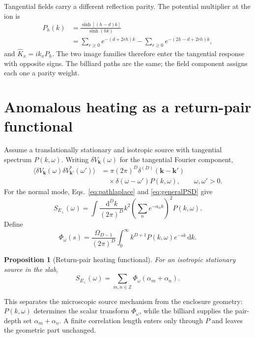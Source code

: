 \documentclass[aps,pra,twocolumn,superscriptaddress,longbibliography,nofootinbib,floatfix]{revtex4-2}
\newtheorem{proposition}{Proposition}
\theoremstyle{remark}
\newcommand{\dd}{\mathrm d}
\newcommand{\kvec}{\bm k}
\newcommand{\Khat}{\widehat K}
\begin{document}
Tangential fields carry a different reflection parity.  The potential multiplier at the ion is
\begin{align}
P_h(k)&=\frac{\sinh[(h-d)k]}{\sinh(hk)}\nonumber\\
&=\sum_{r\ge0}e^{-(d+2rh)k}
-\sum_{r\ge0}e^{-(2h-d+2rh)k},
\label{eq:tangentmeasure}
\end{align}
and $\Khat_x=i k_xP_h$.  The two image families therefore enter the tangential response with opposite signs.  The billiard paths are the same; the field component assigns each one a parity weight.

\section{Anomalous heating as a return-pair functional}
\label{sec:heatingzeta}

Assume a translationally stationary and isotropic source with tangential spectrum $P(k,\omega)$.  Writing $\delta V_{\kvec}(\omega)$ for the tangential Fourier component,
\begin{align}
\langle \delta V_{\kvec}(\omega)\delta V_{\kvec'}^*(\omega')\rangle
&=\pi(2\pi)^D\delta^{(D)}(\kvec-\kvec')\nonumber\\
&\quad\times\delta(\omega-\omega')P(k,\omega),
\qquad \omega,\omega'>0.
\end{align}
For the normal mode, Eqs.~\eqref{eq:pathlaplace} and \eqref{eq:generalPSD} give
\begin{equation}
S_{E_\perp}(\omega)=\int\frac{\dd^Dk}{(2\pi)^D}
 k^2\left(\sum_ne^{-\alpha_n k}\right)^2P(k,\omega).
\label{eq:SEk}
\end{equation}
Define
\begin{equation}
\Phi_\omega(s)=\frac{\Omega_{D-1}}{(2\pi)^D}
\int_0^\infty k^{D+1}P(k,\omega)e^{-sk}\,\dd k.
\label{eq:Phi}
\end{equation}

\begin{proposition}[Return-pair heating functional]
For an isotropic stationary source in the slab,
\begin{equation}
\boxed{\displaystyle
S_{E_\perp}(\omega)=\sum_{m,n\in\mathbb Z}
\Phi_\omega(\alpha_m+\alpha_n).}
\label{eq:returnpairfunctional}
\end{equation}
\end{proposition}

This separates the microscopic source mechanism from the enclosure geometry: $P(k,\omega)$ determines the scalar transform $\Phi_\omega$, while the billiard supplies the pair-depth set $\alpha_m+\alpha_n$.  A finite correlation length enters only through $P$ and leaves the geometric part unchanged.
\end{document}
